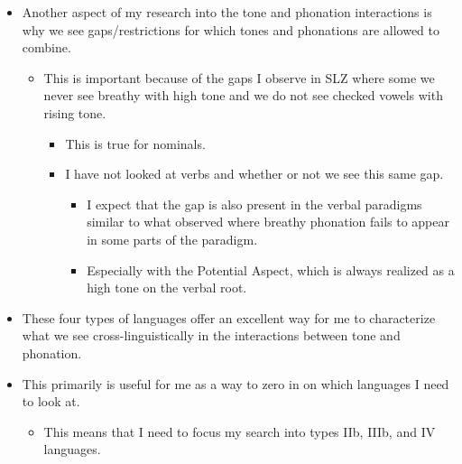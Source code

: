 \begin{itemize}
    \item Another aspect of my research into the tone and phonation interactions is why we see gaps/restrictions for which tones and phonations are allowed to combine. 
    \begin{itemize}
        \item This is important because of the gaps I observe in SLZ where some we never see breathy with high tone and we do not see checked vowels with rising tone. 
        \begin{itemize}
            \item This is true for nominals. 
            \item I have not looked at verbs and whether or not we see this same gap. 
            \begin{itemize}
                \item I expect that the gap is also present in the verbal paradigms similar to what \citet{uchiharaToneRegistrogenesisQuiavini2016} observed where breathy phonation fails to appear in some parts of the paradigm.
                \item Especially with the Potential Aspect, which is always realized as a high tone on the verbal root. 
            \end{itemize}
        \end{itemize}
    \end{itemize}
    \item These four types of languages offer an excellent way for me to characterize what we see cross-linguistically in the interactions between tone and phonation. 
    \item This primarily is useful for me as a way to zero in on which languages I need to look at. 
    \begin{itemize}
        \item This means that I need to focus my search into types IIb, IIIb, and IV languages.
    \end{itemize}
\end{itemize}

